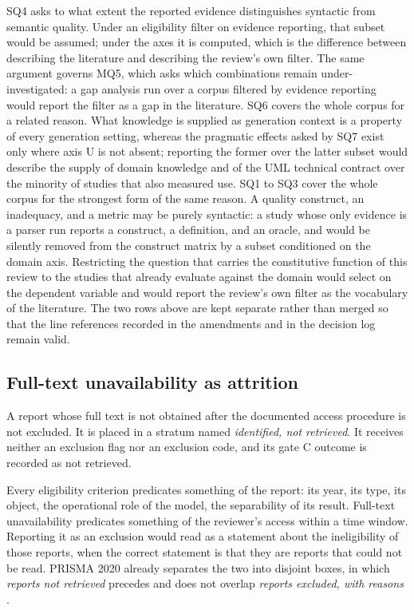 SQ4 asks to what extent the reported evidence distinguishes syntactic from semantic quality. Under an eligibility filter on evidence reporting, that subset would be assumed; under the axes it is computed, which is the difference between describing the literature and describing the review's own filter. The same argument governs MQ5, which asks which combinations remain under-investigated: a gap analysis run over a corpus filtered by evidence reporting would report the filter as a gap in the literature. SQ6 covers the whole corpus for a related reason. What knowledge is supplied as generation context is a property of every generation setting, whereas the pragmatic effects asked by SQ7 exist only where axis U is not absent; reporting the former over the latter subset would describe the supply of domain knowledge and of the UML technical contract over the minority of studies that also measured use. SQ1 to SQ3 cover the whole corpus for the strongest form of the same reason. A quality construct, an inadequacy, and a metric may be purely syntactic: a study whose only evidence is a parser run reports a construct, a definition, and an oracle, and would be silently removed from the construct matrix by a subset conditioned on the domain axis. Restricting the question that carries the constitutive function of this review to the studies that already evaluate against the domain would select on the dependent variable and would report the review's own filter as the vocabulary of the literature. The two rows above are kept separate rather than merged so that the line references recorded in the amendments and in the decision log remain valid.

\subsection{Full-text unavailability as attrition}
\label{sec:protocol_attrition}

A report whose full text is not obtained after the documented access procedure is not excluded. It is placed in a stratum named \textit{identified, not retrieved}. It receives neither an exclusion flag nor an exclusion code, and its gate C outcome is recorded as not retrieved.

Every eligibility criterion predicates something of the report: its year, its type, its object, the operational role of the model, the separability of its result. Full-text unavailability predicates something of the reviewer's access within a time window. Reporting it as an exclusion would read as a statement about the ineligibility of those reports, when the correct statement is that they are reports that could not be read. PRISMA 2020 already separates the two into disjoint boxes, in which \textit{reports not retrieved} precedes and does not overlap \textit{reports excluded, with reasons} \cite{Page2021PRISMA}.

